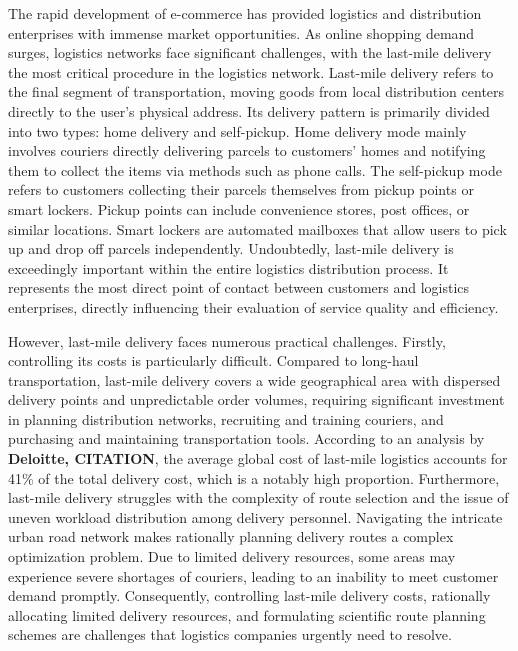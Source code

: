 \documentclass[preprint,12pt,authoryear]{elsarticle}
\begin{document}
The rapid development of e-commerce has provided logistics and distribution enterprises with immense market opportunities. As online shopping demand surges, logistics networks face significant challenges, with the last-mile delivery the most critical procedure in the logistics network. Last-mile delivery refers to the final segment of transportation, moving goods from local distribution centers directly to the user's physical address. Its delivery pattern is primarily divided into two types: home delivery and self-pickup. 
Home delivery mode mainly involves couriers directly delivering parcels to customers' homes and notifying them to collect the items via methods such as phone calls. The self-pickup mode refers to customers collecting their parcels themselves from pickup points or smart lockers. Pickup points can include convenience stores, post offices, or similar locations. Smart lockers are automated mailboxes that allow users to pick up and drop off parcels independently.
Undoubtedly, last-mile delivery is exceedingly important within the entire logistics distribution process. It represents the most direct point of contact between customers and logistics enterprises, directly influencing their evaluation of service quality and efficiency.

However, last-mile delivery faces numerous practical challenges. Firstly, controlling its costs is particularly difficult. Compared to long-haul transportation, last-mile delivery covers a wide geographical area with dispersed delivery points and unpredictable order volumes, requiring significant investment in planning distribution networks, recruiting and training couriers, and purchasing and maintaining transportation tools. According to an analysis by \textbf{Deloitte, CITATION}, the average global cost of last-mile logistics accounts for 41\% of the total delivery cost, which is a notably high proportion.
Furthermore, last-mile delivery struggles with the complexity of route selection and the issue of uneven workload distribution among delivery personnel. Navigating the intricate urban road network makes rationally planning delivery routes a complex optimization problem. Due to limited delivery resources, some areas may experience severe shortages of couriers, leading to an inability to meet customer demand promptly.
Consequently, controlling last-mile delivery costs, rationally allocating limited delivery resources, and formulating scientific route planning schemes are challenges that logistics companies urgently need to resolve.
\end{document}
